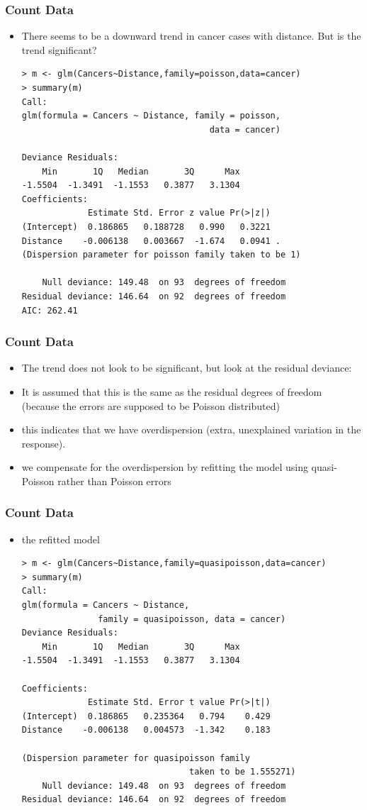 \begin{frame}[fragile]\frametitle{Count Data}
  \begin{itemize}
  \item There seems to be a downward trend in cancer cases with distance. But is the trend significant?\footnotesize
\begin{verbatim}
> m <- glm(Cancers~Distance,family=poisson,data=cancer)
> summary(m)
Call:
glm(formula = Cancers ~ Distance, family = poisson, 
                                     data = cancer)

Deviance Residuals: 
    Min       1Q   Median       3Q      Max  
-1.5504  -1.3491  -1.1553   0.3877   3.1304  
Coefficients:
             Estimate Std. Error z value Pr(>|z|)  
(Intercept)  0.186865   0.188728   0.990   0.3221  
Distance    -0.006138   0.003667  -1.674   0.0941 .
(Dispersion parameter for poisson family taken to be 1)

    Null deviance: 149.48  on 93  degrees of freedom
Residual deviance: 146.64  on 92  degrees of freedom
AIC: 262.41
\end{verbatim}
  \end{itemize}
\end{frame}


\begin{frame}[fragile]\frametitle{Count Data}
  \begin{itemize}
  \item The trend does not look to be significant, but look at the residual deviance:
  \item It is assumed that this is the same as the residual degrees of freedom (because the errors are supposed to be Poisson distributed) 
  \item this indicates that we have overdispersion (extra, unexplained variation in the response). 
  \item we compensate for the overdispersion by refitting the model using quasi-Poisson rather than Poisson errors
  \end{itemize}
\end{frame}

\begin{frame}[fragile]\frametitle{Count Data}
  \begin{itemize}
\item the refitted model\footnotesize
\begin{verbatim}
> m <- glm(Cancers~Distance,family=quasipoisson,data=cancer)
> summary(m)
Call:
glm(formula = Cancers ~ Distance, 
               family = quasipoisson, data = cancer)
Deviance Residuals: 
    Min       1Q   Median       3Q      Max  
-1.5504  -1.3491  -1.1553   0.3877   3.1304  

Coefficients:
             Estimate Std. Error t value Pr(>|t|)
(Intercept)  0.186865   0.235364   0.794    0.429
Distance    -0.006138   0.004573  -1.342    0.183

(Dispersion parameter for quasipoisson family 
                                 taken to be 1.555271)
    Null deviance: 149.48  on 93  degrees of freedom
Residual deviance: 146.64  on 92  degrees of freedom
\end{verbatim}
  \end{itemize}
\end{frame}

